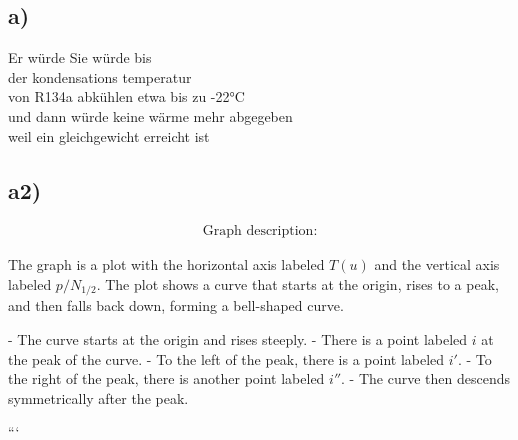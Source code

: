 \subsection*{a)}
Er würde Sie würde bis \\
der kondensations temperatur \\
von R134a abkühlen etwa bis zu -22°C \\
und dann würde keine wärme mehr abgegeben \\
weil ein gleichgewicht erreicht ist

\subsection*{a2)}
\[
\begin{array}{c}
\text{Graph description:}
\end{array}
\]

The graph is a plot with the horizontal axis labeled \( T (u) \) and the vertical axis labeled \( p / N_{1/2} \). The plot shows a curve that starts at the origin, rises to a peak, and then falls back down, forming a bell-shaped curve. 

- The curve starts at the origin and rises steeply.
- There is a point labeled \( i \) at the peak of the curve.
- To the left of the peak, there is a point labeled \( i' \).
- To the right of the peak, there is another point labeled \( i'' \).
- The curve then descends symmetrically after the peak.

```